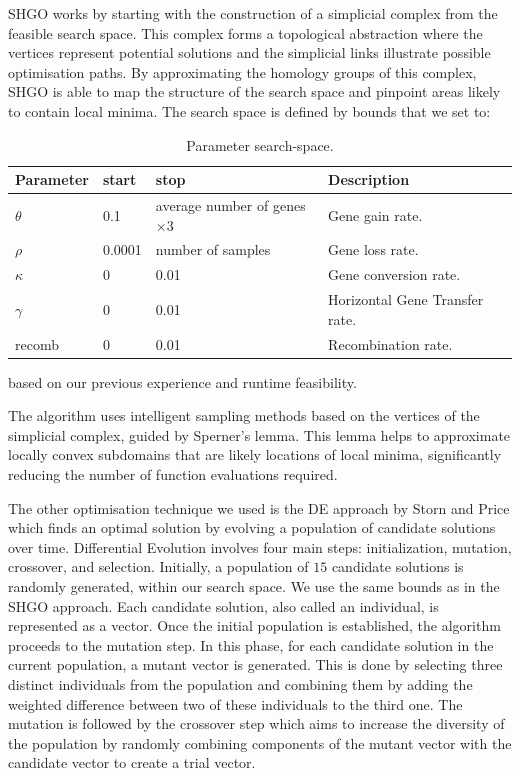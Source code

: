 \ac{SHGO} works by starting with the construction of a simplicial complex from the feasible search space.
This complex forms a topological abstraction where the vertices represent potential solutions and the simplicial links illustrate possible optimisation paths.
By approximating the homology groups of this complex, \ac{SHGO} is able to map the structure of the search space and pinpoint areas likely to contain local minima.
The search space is defined by bounds that we set to:

\begin{table}[h]
    \begin{adjustbox}{width=\textwidth}
        \begin{tabular}{llll}
            Parameter & start  & stop                               & Description                    \\
            \hline
            $\theta$  & 0.1    & average number of genes $\times 3$ & Gene gain rate.                \\
            $\rho$    & 0.0001 & number of samples                  & Gene loss rate.                \\
            $\kappa$  & 0      & 0.01                               & Gene conversion rate.          \\
            $\gamma$  & 0      & 0.01                               & Horizontal Gene Transfer rate. \\
            recomb    & 0      & 0.01                               & Recombination rate.
        \end{tabular}
    \end{adjustbox}
    \caption{Parameter search-space.}
\end{table}

based on our previous experience and runtime feasibility.

The algorithm uses intelligent sampling methods based on the vertices of the simplicial complex, guided by Sperner's lemma.
This lemma helps to approximate locally convex subdomains that are likely locations of local minima, significantly reducing the number of function evaluations required.

The other optimisation technique we used is the \ac{DE} approach by Storn and Price \cite{Diff_Evo_Storn_1997} which finds an optimal solution by evolving a population of candidate solutions over time.
Differential Evolution involves four main steps: initialization, mutation, crossover, and selection.
Initially, a population of $15$ candidate solutions is randomly generated, within our search space. We use the same bounds as in the \ac{SHGO} approach.
Each candidate solution, also called an individual, is represented as a vector.
Once the initial population is established, the algorithm proceeds to the mutation step.
In this phase, for each candidate solution in the current population, a mutant vector is generated.
This is done by selecting three distinct individuals from the population and combining them by adding the weighted difference between two of these individuals to the third one.
The mutation is followed by the crossover step which aims to increase the diversity of the population by randomly combining components of the mutant vector with the candidate vector to create a trial vector.

